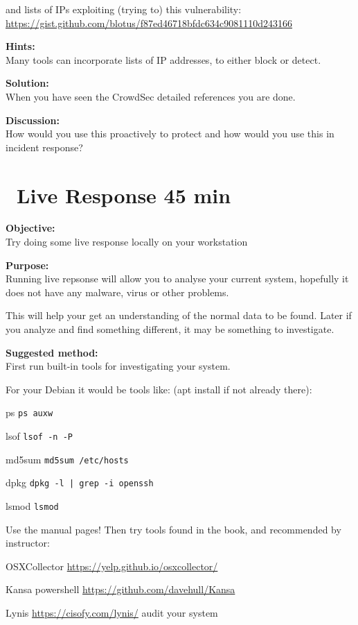 \documentclass[a4paper,11pt,notitlepage]{report}
\begin{document}
and lists of IPs exploiting (trying to) this vulnerability:\\
\url{https://gist.github.com/blotus/f87ed46718bfdc634c9081110d243166}

{\bf Hints:}\\
Many tools can incorporate lists of IP addresses, to either block or detect.

{\bf Solution:}\\
When you have seen the CrowdSec detailed references you are done.

{\bf Discussion:}\\
How would you use this proactively to protect and how would you use this in incident response?



\chapter{\faExclamationTriangle\ Live Response 45 min}
\label{ex:live-response}

{\bf Objective:}\\
Try doing some live response locally on your workstation


{\bf Purpose:}\\
Running live repsonse will allow you to analyse your current system, hopefully it does not have any malware, virus or other problems.

This will help your get an understanding of the normal data to be found. Later if you analyze and find something different, it may be something to investigate.

{\bf Suggested method:}\\
First run built-in tools for investigating your system.

For your Debian it would be tools like: (apt install if not already there):

\begin{list2}
\item ps \verb+ps auxw+
\item lsof \verb+lsof -n -P+
\item md5sum \verb+md5sum /etc/hosts+
\item dpkg \verb+dpkg -l | grep -i openssh+
\item lsmod \verb+lsmod+
\end{list2}

Use the manual pages! Then try tools found in the book, and recommended by instructor:
\begin{list2}
\item OSXCollector \url{https://yelp.github.io/osxcollector/}
\item Kansa powershell \url{https://github.com/davehull/Kansa}
\item Lynis \url{https://cisofy.com/lynis/} audit your system
\end{list2}
\end{document}
